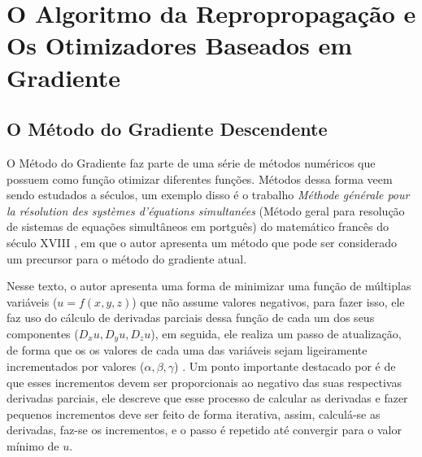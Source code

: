 
\chapter{O Algoritmo da Repropropagação e Os Otimizadores Baseados em Gradiente}
\label{cap:retropropagacao-gradiente}



\section{O Método do Gradiente Descendente}

O Método do Gradiente faz parte de uma série de métodos numéricos que possuem como função otimizar diferentes funções. Métodos dessa forma veem sendo estudados a séculos, um exemplo disso é o trabalho \textit{M{\'e}thode g{\'e}n{\'e}rale pour la r{\'e}solution des syst{\`e}mes d'{\'e}quations simultan{\'e}es} (Método geral para resolução de sistemas de equações simultâneos em portguês) do matemático francês do século XVIII \textcite{CauchyMetodoDoGradiente}, em que o autor apresenta um método que pode ser considerado um precursor para o método do gradiente atual.

Nesse texto, o autor apresenta uma forma de minimizar uma função de múltiplas variáveis ($u=f(x,y,z)$) que não assume valores negativos, para fazer isso, ele faz uso do cálculo de derivadas parciais dessa função de cada um dos seus componentes ($D_x u, D_y u, D_z u$), em seguida, ele realiza um passo de atualização, de forma que os os valores de cada uma das variáveis sejam ligeiramente incrementados por valores ($\alpha, \beta, \gamma$) \parencite{CauchyMetodoDoGradiente}. Um ponto importante destacado por \textcite{CauchyMetodoDoGradiente} é de que esses incrementos devem ser proporcionais ao negativo das suas respectivas derivadas parciais, ele descreve que esse processo de calcular as derivadas e fazer pequenos incrementos deve ser feito de forma iterativa, assim, calculá-se as derivadas, faz-se os incrementos, e o passo é repetido até convergir para o valor mínimo de $u$.

